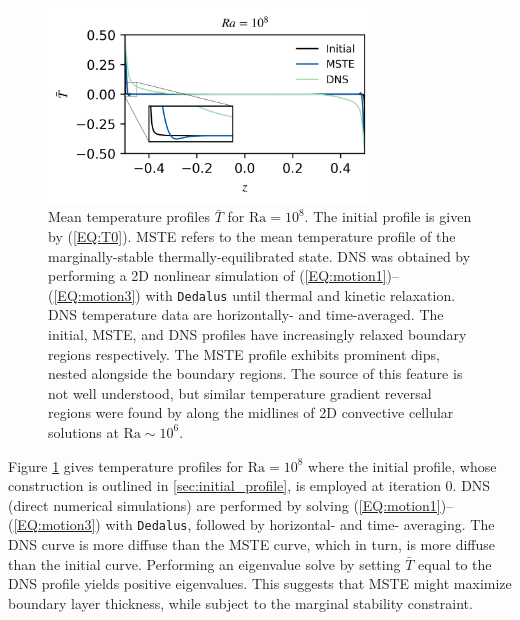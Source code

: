 \documentclass[reprint,amsmath,amssymb,aps]{revtex4-1}
\newcommand\Ra{\mathrm{Ra}}
\newcommand{\eq}[1]{(\ref{#1})}
\newcommand{\eqss}[2]{(\ref{#1})--(\ref{#2})}
\begin{document}
\begin{figure}
    \centering
    \includegraphics[width=3.4in]{T_profs_na.png}
    \caption{Mean temperature profiles $\bar{T}$ for $\Ra = 10^8$. 
    The initial profile is given by \eq{EQ:T0}. 
    MSTE refers to the mean temperature profile of the marginally-stable thermally-equilibrated state. 
    DNS was obtained by performing a 2D nonlinear simulation of \eqss{EQ:motion1}{EQ:motion3} with \texttt{Dedalus} until thermal and kinetic relaxation. 
    DNS temperature data are horizontally- and time-averaged. 
    The initial, MSTE, and DNS profiles have increasingly relaxed boundary regions respectively. 
    The MSTE profile exhibits prominent dips, nested alongside the boundary regions. 
    The source of this feature is not well understood, but similar temperature gradient reversal regions were found by \cite{chini_cells} along the midlines of 2D convective cellular solutions at $\Ra \sim 10^6$.}
    \label{fig:T0_profiles}
\end{figure}

Figure \ref{fig:T0_profiles} gives temperature profiles for $\Ra = 10^8$ where the initial profile, whose construction is outlined in \ref{sec:initial_profile}, is employed at iteration 0. 
DNS (direct numerical simulations) are performed by solving \eqss{EQ:motion1}{EQ:motion3} with \texttt{Dedalus}, followed by horizontal- and time- averaging. 
The DNS curve is more diffuse than the MSTE curve, which in turn, is more diffuse than the initial curve. 
Performing an eigenvalue solve by setting $\bar{T}$ equal to the DNS profile yields positive eigenvalues. 
This suggests that MSTE might maximize boundary layer thickness, while subject to the marginal stability constraint.
\end{document}
